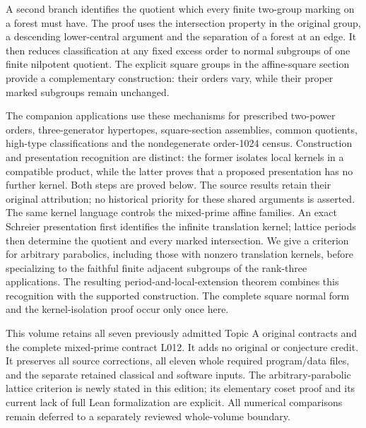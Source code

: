A second branch identifies the quotient which every finite two-group
marking on a forest must have. The proof uses the intersection property
in the original group, a descending lower-central argument and the
separation of a forest at an edge. It then reduces classification at any
fixed excess order to normal subgroups of one finite nilpotent quotient.
The explicit square groups in the affine-square section provide a complementary
construction: their orders vary, while their proper marked subgroups
remain unchanged.

The companion applications use these mechanisms for prescribed two-power
orders, three-generator hypertopes, square-section assemblies, common
quotients, high-type classifications and the nondegenerate order-1024 census.
Construction and presentation recognition are distinct: the former isolates
local kernels in a compatible product, while the latter proves that a proposed
presentation has no further kernel. Both steps are proved below. The source
results retain their original attribution; no historical priority for these
shared arguments is asserted.
The same kernel language controls the mixed-prime affine families. An exact
Schreier presentation first identifies the infinite translation kernel; lattice
periods then determine the quotient and every marked intersection. We give a
criterion for arbitrary parabolics, including those with nonzero translation
kernels, before specializing to the faithful finite adjacent subgroups of the
rank-three applications. The resulting period-and-local-extension theorem
combines this recognition with the supported construction. The complete
square normal form and the kernel-isolation proof occur only once here.

This volume retains all seven previously admitted Topic A original contracts
and the complete mixed-prime contract L012. It adds no original or conjecture
credit. It preserves all source corrections, all eleven whole required
program/data files, and the separate retained classical and software inputs.
The arbitrary-parabolic lattice criterion is newly stated in this edition;
its elementary coset proof and its current lack of full Lean formalization are
explicit. All numerical comparisons remain deferred to a separately reviewed
whole-volume boundary.


















